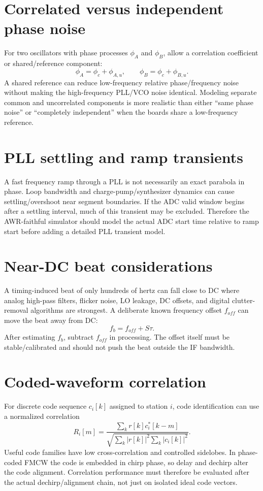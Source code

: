 \documentclass[11pt]{article}
\begin{document}
\section{Correlated versus independent phase noise}
For two oscillators with phase processes $\phi_A$ and $\phi_B$, allow a correlation coefficient or shared/reference component:
\[
\phi_A=\phi_c+\phi_{A,u},\qquad
\phi_B=\phi_c+\phi_{B,u}.
\]
A shared reference can reduce low-frequency relative phase/frequency noise without making the high-frequency PLL/VCO noise identical. Modeling separate common and uncorrelated components is more realistic than either ``same phase noise'' or ``completely independent'' when the boards share a low-frequency reference.

\section{PLL settling and ramp transients}
A fast frequency ramp through a PLL is not necessarily an exact parabola in phase. Loop bandwidth and charge-pump/synthesizer dynamics can cause settling/overshoot near segment boundaries. If the ADC valid window begins after a settling interval, much of this transient may be excluded. Therefore the AWR-faithful simulator should model the actual ADC start time relative to ramp start before adding a detailed PLL transient model.

\section{Near-DC beat considerations}
A timing-induced beat of only hundreds of hertz can fall close to DC where analog high-pass filters, flicker noise, LO leakage, DC offsets, and digital clutter-removal algorithms are strongest. A deliberate known frequency offset $f_{off}$ can move the beat away from DC:
\[
f_b=f_{off}+S\tau.
\]
After estimating $f_b$, subtract $f_{off}$ in processing. The offset itself must be stable/calibrated and should not push the beat outside the IF bandwidth.

\section{Coded-waveform correlation}
For discrete code sequence $c_i[k]$ assigned to station $i$, code identification can use a normalized correlation
\[
R_i[m]=\frac{\sum_k r[k]c_i^*[k-m]}{\sqrt{\sum_k|r[k]|^2\sum_k|c_i[k]|^2}}.
\]
Useful code families have low cross-correlation and controlled sidelobes. In phase-coded FMCW the code is embedded in chirp phase, so delay and dechirp alter the code alignment. Correlation performance must therefore be evaluated after the actual dechirp/alignment chain, not just on isolated ideal code vectors.
\end{document}
